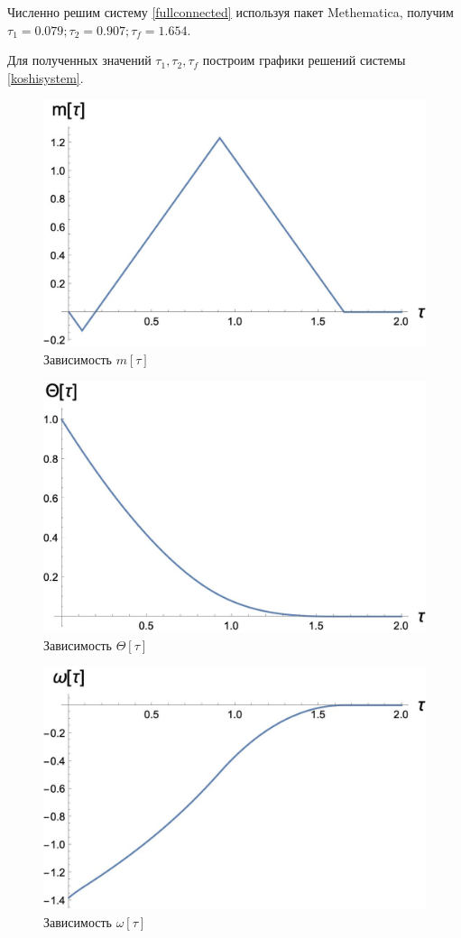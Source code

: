 \documentclass[a4paper,14pt]{article}
\theoremstyle{plain} %
\theoremstyle{definition} %
\theoremstyle{remark} %
\begin{document}
{Численно решим систему \eqref{fullconnected} используя пакет Methematica,
получим $\tau_1=0.079;\tau_2=0.907;\tau_f=1.654.$

Для полученных значений $\tau_1,\tau_2,\tau_f$ построим графики решений системы \eqref{koshisystem}.

\begin{figure}[h!]
    \centering
    \includegraphics[width=0.9\linewidth]{m_from_t.jpeg}
    \caption{Зависимость $m[\tau]$}
    \label{fig:m}
\end{figure}
\begin{figure}[h!]
    \centering
    \includegraphics[width=0.9\linewidth]{theta_from_t.jpeg}
    \caption{Зависимость $\Theta[\tau]$}
    \label{fig:theta}
\end{figure}
\begin{figure}[h!]
    \centering
    \includegraphics[width=0.9\linewidth]{oemga_from_t.jpeg}
    \caption{Зависимость $\omega[\tau]$}
    \label{fig:omega}
\end{figure}

}
\end{document}
